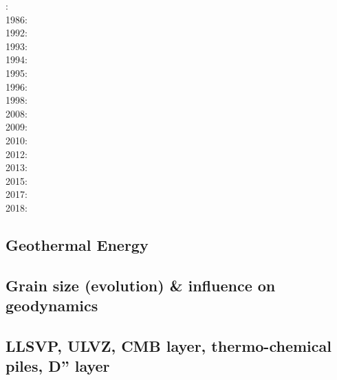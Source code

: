 {\scriptsize
{}: \cite{davi84}\cite{hage84}\\
1986: \cite{davi86}\\
1992: \cite{zhgu92}\cite{kiha92}\\
1993: \cite{zhch93}\cite{rirl93}\\
1994: \cite{kiha94}\\
1995: \cite{king95}\cite{mopa95}\\
1996: \cite{mogu96}\\
1998: \cite{cava98}\cite{chki98}\\
2008: \cite{meco08}\\
2009: \cite{king09}\\
2010: \cite{ghbz10}\cite{spgs10b}\\
2012: \cite{hibi12}\\
2013: \cite{shsc13}\\
2015: \cite{lizh15}\\
2017: \cite{grab17}\\
2018: \cite{king18}
}

\subsection{Geothermal Energy} 

{\scriptsize
\noindent
\cite{quxm15}
\cite{revf19}
}

\subsection{Grain size (evolution) \& influence on geodynamics}
\label{sec:topics:gsev}

{\scriptsize
\noindent
\cite{kara84}
\cite{brcp99}
\cite{dets01}\cite{solo01}
\cite{soet02}
\cite{hapa03}\cite{reyu03}
\cite{sore08}
\cite{rorb11}
\cite{beri13}
\cite{besr14}
\cite{thrk15}\cite{tukb15}\cite{pevp15}
\cite{ceww17}\cite{daef17}\cite{mube17}\cite{scdu17}
\cite{bemu18}\cite{bezb18}\cite{mube18}
}

\subsection{LLSVP, ULVZ, CMB layer, thermo-chemical piles, D'' layer}

